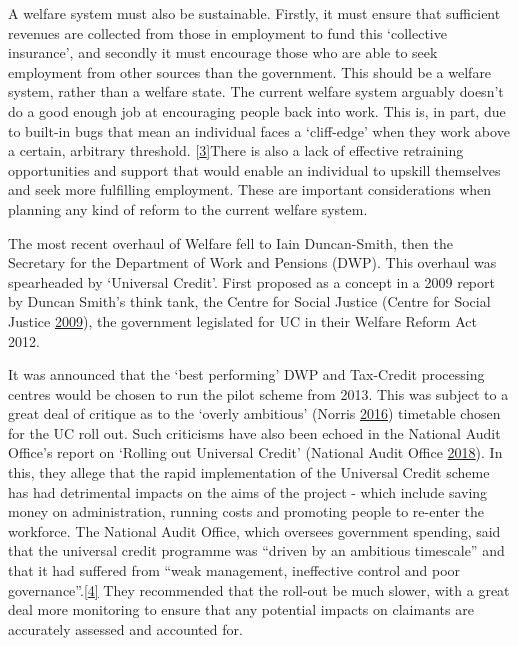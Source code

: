 \documentclass[]{tufte-handout}
\begin{document}
A welfare system must also be sustainable. Firstly, it must ensure that
sufficient revenues are collected from those in employment to fund this
`collective insurance', and secondly it must encourage those who are
able to seek employment from other sources than the government. This
should be a welfare system, rather than a welfare state. The current
welfare system arguably doesn't do a good enough job at encouraging
people back into work. This is, in part, due to built-in bugs that mean
an individual faces a `cliff-edge' when they work above a certain,
arbitrary threshold. {[}\protect\hyperlink{_ftn3}{3{]}}There is also a
lack of effective retraining opportunities and support that would enable
an individual to upskill themselves and seek more fulfilling employment.
These are important considerations when planning any kind of reform to
the current welfare system.

The most recent overhaul of Welfare fell to Iain Duncan-Smith, then the
Secretary for the Department of Work and Pensions (DWP). This overhaul
was spearheaded by `Universal Credit'. First proposed as a concept in a
2009 report by Duncan Smith's think tank, the Centre for Social Justice
(Centre for Social Justice
\protect\hyperlink{ref-CentreforSocialJustice2009}{2009}), the
government legislated for UC in their Welfare Reform Act 2012.

It was announced that the `best performing' DWP and Tax-Credit
processing centres would be chosen to run the pilot scheme from 2013.
This was subject to a great deal of critique as to the `overly
ambitious' (Norris \protect\hyperlink{ref-Norris2016}{2016}) timetable
chosen for the UC roll out. Such criticisms have also been echoed in the
National Audit Office's report on `Rolling out Universal Credit'
(National Audit Office
\protect\hyperlink{ref-NationalAuditOffice2018}{2018}). In this, they
allege that the rapid implementation of the Universal Credit scheme has
had detrimental impacts on the aims of the project - which include
saving money on administration, running costs and promoting people to
re-enter the workforce. The National Audit Office, which oversees
government spending, said that the universal credit programme was
``driven by an ambitious timescale'' and that it had suffered from
``weak management, ineffective control and poor
governance''.{[}\protect\hyperlink{_ftn4}{4{]}} They recommended that
the roll-out be much slower, with a great deal more monitoring to ensure
that any potential impacts on claimants are accurately assessed and
accounted for.
\end{document}
